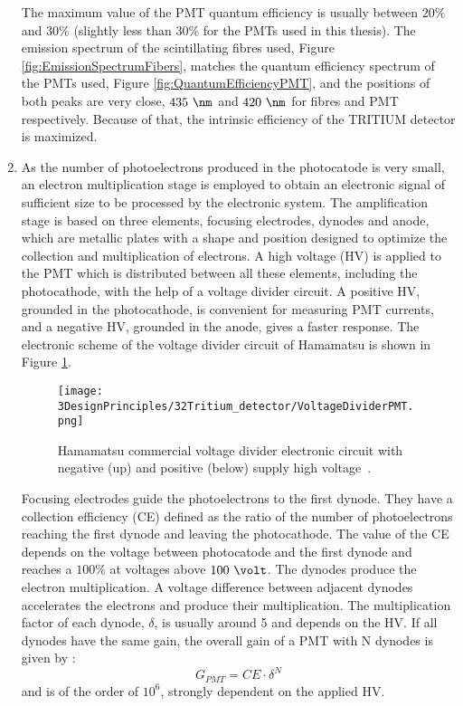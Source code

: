 \begin{enumerate}
The maximum value of the PMT quantum efficiency is usually between $20\%$ and $30\%$ \cite{Knoll} (slightly less than $30\%$ for the PMTs used in this thesis). The emission spectrum of the scintillating fibres used, Figure \ref{fig:EmissionSpectrumFibers}, matches the quantum efficiency spectrum of the PMTs used, Figure \ref{fig:QuantumEfficiencyPMT}, and the positions of both peaks are very close, $435~\nm$ and $420~\nm$ for fibres and PMT respectively. Because of that, the intrinsic efficiency of the TRITIUM detector is maximized.

\item{} As the number of photoelectrons produced in the photocatode is very small, an electron multiplication stage is employed to obtain an electronic signal of sufficient size to be processed by the electronic system. The amplification stage is based on three elements, focusing electrodes, dynodes and anode, which are metallic plates with a shape and position designed to optimize the collection and multiplication of electrons. A high voltage (HV) is applied to the PMT which is distributed between all these elements, including the photocathode, with the help of a voltage divider circuit. A positive HV, grounded in the photocathode, is convenient for measuring PMT currents, and a negative HV, grounded in the anode, gives a faster response. The electronic scheme of the voltage divider circuit of Hamamatsu is shown in Figure \ref{fig:VoltageDividerCircuit}.

\begin{figure}[h]
\centering
\texttt{[image: 3DesignPrinciples/32Tritium\_detector/VoltageDividerPMT.png]}
\caption{Hamamatsu commercial voltage divider electronic circuit with negative (up) and positive (below) supply high voltage\label{fig:VoltageDividerCircuit}~\cite{DataSheetPMTs}.}
\end{figure}


Focusing electrodes guide the photoelectrons to the first dynode. They have a collection efficiency (CE) defined as the ratio of the number of photoelectrons reaching the first dynode and leaving the photocathode. The value of the CE depends on the voltage between photocatode and the first dynode and reaches a $100\%$ at voltages above $100~\volt$. The dynodes produce the electron multiplication. A voltage difference between adjacent dynodes accelerates the electrons and produce their multiplication. The multiplication factor of each dynode, $\delta$, is usually around 5 and depends on the HV. If all dynodes have the same gain, the overall gain of a PMT with N dynodes is given by \cite{Knoll}:
\begin{equation}
G_{PMT} = CE\cdot{} \delta^N
\label{eq:PMTGain}
\end{equation}
and is of the order of $10^6$, strongly dependent on the applied HV.


\end{enumerate}
